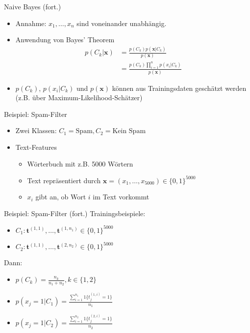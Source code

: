 \documentclass[xcolor={dvipsnames,svgnames},draft]{beamer}
\begin{document}
\begin{frame}{Naive Bayes (fort.)}
  \begin{itemize}
  \item Annahme: $x_1,\ldots,x_n$ sind voneinander unabhängig.
  \item Anwendung von Bayes' Theorem
    \begin{align*}
      p(C_k\vert \mathbf{x}) 
      &= \frac{p(C_k)p(\mathbf{x}|C_k)}{p(\mathbf{x})} \\
      &= \frac{p(C_k)\prod_{i=1}^n p(x_i|C_k)}{p(\mathbf{x})}
    \end{align*}
  \item $p(C_k)$, $p(x_i\vert C_k)$ und $p(\mathbf{x})$ können aus
    Trainingsdaten geschätzt werden (z.B. über Maximum-Likelihood-Schätzer)
  \end{itemize}
\end{frame}

\begin{frame}{Beispiel: Spam-Filter}
  \begin{itemize}
  \item Zwei Klassen: $C_1=\text{Spam}, C_2=\text{Kein Spam}$
  \item Text-Features
    \begin{itemize}
    \item Wörterbuch mit z.B. 5000 Wörtern
    \item Text repräsentiert durch $\mathbf{x} = (x_1,\ldots,x_{5000}) \in
      \{0,1\}^{5000}$ 
    \item $x_i$ gibt an, ob Wort $i$ im Text vorkommt
    \end{itemize}
  \end{itemize}
\end{frame}

\begin{frame}{Beispiel: Spam-Filter (fort.)}
  Trainingsbeispiele:
  \begin{itemize}
  \item $C_1: \mathbf{t}^{(1,1)},\ldots,\mathbf{t}^{(1,n_1)} \in \{0,1\}^{5000}$
  \item $C_2: \mathbf{t}^{(1,1)},\ldots,\mathbf{t}^{(2,n_2)} \in \{0,1\}^{5000}$
  \end{itemize}

  Dann:
  \begin{itemize}
  \item $p(C_k) = \frac{n_k}{n_1 + n_2}, k \in \{1,2\}$
  \item $p(x_j = 1 | C_1) = \frac{\sum_{i=1}^{n_1} 1\{t^{(1,i)}_j = 1\}}{n_1}$
  \item $p(x_j = 1 | C_2) = \frac{\sum_{i=1}^{n_2} 1\{t^{(2,i)}_j = 1\}}{n_2}$
  \end{itemize}
\end{frame}
\end{document}
